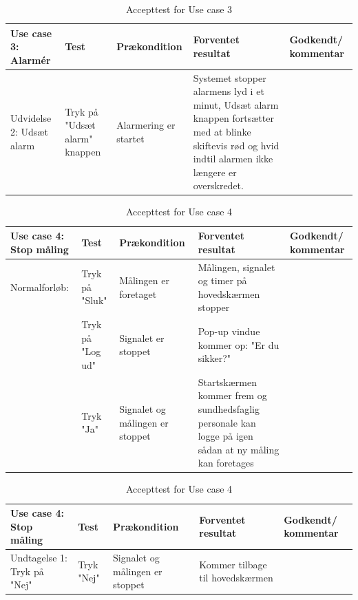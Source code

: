 \begin{table}[H]
\caption{Accepttest for Use case 3}\label{tab:tabel15}
\begin{tabular}{|>{\raggedright\arraybackslash}p{2.5cm}| >{\raggedright\arraybackslash}p{2.9cm} | >{\raggedright\arraybackslash}p{2.9cm} | >{\raggedright\arraybackslash}p{2.9cm} | >{\raggedright\arraybackslash}p{2.8cm} |}
   \hline
   \textbf{Use case 3: Alarmér } &\textbf{Test}& \textbf{Prækondition} & \textbf{Forventet resultat} & \textbf{Godkendt/ kommentar}\\ \hline
   Udvidelse 2: Udsæt alarm & Tryk på "Udsæt alarm" knappen & Alarmering er startet & Systemet stopper alarmens lyd i et minut, Udsæt alarm knappen fortsætter med at blinke skiftevis rød og hvid indtil alarmen ikke længere er overskredet.  &\\\hline
\end{tabular}
\end{table}




\begin{table}[H]
\caption{Accepttest for Use case 4}\label{tab:tabel16}
\begin{tabular}{|>{\raggedright\arraybackslash}p{2.5cm}| >{\raggedright\arraybackslash}p{2.9cm} | >{\raggedright\arraybackslash}p{2.9cm} | >{\raggedright\arraybackslash}p{2.9cm} | >{\raggedright\arraybackslash}p{2.8cm} |}
   \hline
   \textbf{Use case 4: Stop måling } &\textbf{Test}& \textbf{Prækondition} & \textbf{Forventet resultat} & \textbf{Godkendt/ kommentar}\\ \hline
   Normalforløb:& Tryk på "Sluk" & Målingen er foretaget & Målingen, signalet og timer på hovedskærmen stopper &\\\hline
   & Tryk på "Log ud" & Signalet er stoppet & Pop-up vindue kommer op: "Er du sikker?" &\\\hline
   &Tryk "Ja"&Signalet og målingen er stoppet& Startskærmen kommer frem og sundhedsfaglig personale kan logge på igen sådan at ny måling kan foretages &\\\hline
\end{tabular}
\end{table}


\begin{table}[H]
\caption{Accepttest for Use case 4}\label{tab:tabel17}
\begin{tabular}{|>{\raggedright\arraybackslash}p{2.5cm}| >{\raggedright\arraybackslash}p{2.9cm} | >{\raggedright\arraybackslash}p{2.9cm} | >{\raggedright\arraybackslash}p{2.9cm} | >{\raggedright\arraybackslash}p{2.8cm} |}
   \hline
   \textbf{Use case 4: Stop måling } &\textbf{Test}& \textbf{Prækondition} & \textbf{Forventet resultat} & \textbf{Godkendt/ kommentar}\\ \hline
Undtagelse 1: Tryk på "Nej" &Tryk "Nej" & Signalet og målingen er stoppet & Kommer tilbage til hovedskærmen &\\\hline
\end{tabular}
\end{table}


